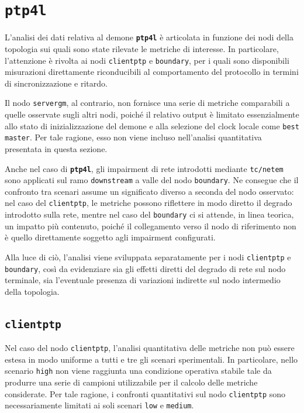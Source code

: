 \section{\texttt{ptp4l}}
L’analisi dei dati relativa al demone \texttt{\textbf{ptp4l}} è articolata in
funzione dei nodi della topologia sui quali sono state rilevate le metriche di
interesse. In particolare, l’attenzione è rivolta ai nodi \texttt{clientptp} e \texttt{boundary},
per i quali sono disponibili misurazioni direttamente riconducibili al comportamento
del protocollo in termini di sincronizzazione e ritardo.

Il nodo \texttt{servergm}, al contrario, non fornisce una serie di metriche
comparabili a quelle osservate sugli altri nodi, poiché il relativo output è limitato
essenzialmente allo stato di inizializzazione del demone e alla selezione del clock
locale come \texttt{best master}. Per tale ragione, esso non viene incluso
nell’analisi quantitativa presentata in questa sezione.

Anche nel caso di \texttt{\textbf{ptp4l}}, gli impairment di rete introdotti
mediante \texttt{tc/netem} sono applicati sul ramo \texttt{downstream} a valle
del nodo \texttt{boundary}. Ne consegue che il confronto tra scenari assume un
significato diverso a seconda del nodo osservato: nel caso del \texttt{clientptp},
le metriche possono riflettere in modo diretto il degrado introdotto sulla rete,
mentre nel caso del \texttt{boundary} ci si attende, in linea teorica, un impatto
più contenuto, poiché il collegamento verso il nodo di riferimento non è quello
direttamente soggetto agli impairment configurati.

Alla luce di ciò, l’analisi viene sviluppata separatamente per i nodi \texttt{clientptp}
e \texttt{boundary}, così da evidenziare sia gli effetti diretti del degrado di
rete sul nodo terminale, sia l’eventuale presenza di variazioni indirette sul nodo
intermedio della topologia.

\subsection{\texttt{clientptp}}
Nel caso del nodo \texttt{clientptp}, l’analisi quantitativa delle metriche non può
essere estesa in modo uniforme a tutti e tre gli scenari sperimentali. In
particolare, nello scenario \texttt{high} non viene raggiunta una condizione
operativa stabile tale da produrre una serie di campioni utilizzabile per il
calcolo delle metriche considerate. Per tale ragione, i confronti quantitativi
sul nodo \texttt{clientptp} sono necessariamente limitati ai soli scenari \texttt{low}
e \texttt{medium}.

